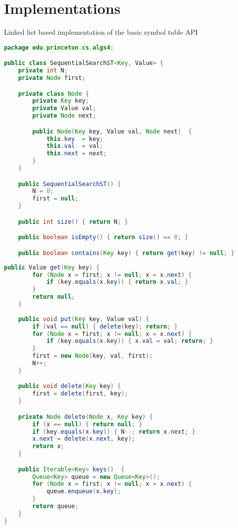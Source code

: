 \documentclass[8pt,a4paper,compress]{beamer}
\begin{document}
\section{Implementations}
\begin{frame}[fragile]
\pause

Linked list based implementation of the basic symbol table API

\smallskip

\begin{lstlisting}[language=Java,style=focusin]
package edu.princeton.cs.algs4;

public class SequentialSearchST<Key, Value> {
    private int N; 
    private Node first; 

    private class Node {
        private Key key;
        private Value val;
        private Node next;

        public Node(Key key, Value val, Node next)  {
            this.key  = key;
            this.val  = val;
            this.next = next;
        }
    }

    public SequentialSearchST() { 
        N = 0; 
        first = null; 
    }

    public int size() { return N; }

    public boolean isEmpty() { return size() == 0; }

    public boolean contains(Key key) { return get(key) != null; }
\end{lstlisting}
\end{frame}

\begin{frame}[fragile]
\pause

\begin{lstlisting}[language=Java,style=focusin]
    public Value get(Key key) {
        for (Node x = first; x != null; x = x.next) {
            if (key.equals(x.key)) { return x.val; }
        }
        return null;
    }
    
    public void put(Key key, Value val) {
        if (val == null) { delete(key); return; }
        for (Node x = first; x != null; x = x.next) {
            if (key.equals(x.key)) { x.val = val; return; }
        }
        first = new Node(key, val, first);
        N++;
    }

    public void delete(Key key) {
        first = delete(first, key);
    }

    private Node delete(Node x, Key key) {
        if (x == null) { return null; }
        if (key.equals(x.key)) { N--; return x.next; }
        x.next = delete(x.next, key);
        return x;
    }

    public Iterable<Key> keys()  {
        Queue<Key> queue = new Queue<Key>();
        for (Node x = first; x != null; x = x.next) {
            queue.enqueue(x.key);
        }
        return queue;
    }
}
\end{lstlisting}
\end{frame}
\end{document}
